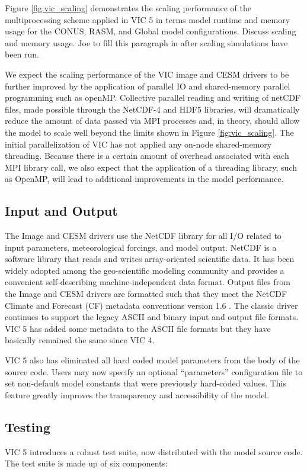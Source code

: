 \documentclass[gmd, manuscript]{copernicus}
\begin{document}
    Figure \ref{fig:vic_scaling} demonstrates the scaling performance of the multiprocessing scheme applied in VIC 5 in terms model runtime and memory usage for the CONUS, RASM, and Global model configurations.
    Discuss scaling and memory usage.
    Joe to fill this paragraph in after scaling simulations have been run.

    We expect the scaling performance of the VIC image and CESM drivers to be further improved by the application of parallel IO and shared-memory parallel programming such as openMP.
    Collective parallel reading and writing of netCDF files, made possible through the NetCDF-4 and HDF5 libraries, will dramatically reduce the amount of data passed via MPI processes and, in theory, should allow the model to scale well beyond the limits shown in Figure \ref{fig:vic_scaling}.
    The initial parallelization of VIC has not applied any on-node shared-memory threading.
    Because there is a certain amount of overhead associated with each MPI library call, we also expect that the application of a threading library, such as OpenMP, will lead to additional improvements in the model performance.

  \subsection{Input and Output}
    \label{sec:io}
    The Image and CESM drivers use the NetCDF library for all I/O related to input parameters, meteorological forcings, and model output.
    NetCDF is a software library that reads and writes array-oriented scientific data.
    It has been widely adopted among the geo-scientific modeling community and provides a convenient self-describing machine-independent data format.
    Output files from the Image and CESM drivers are formatted such that they meet the NetCDF Climate and Forecast (CF) metadata conventions version 1.6 \citep{Eaton_2003}.
    The classic driver continues to support the legacy ASCII and binary input and output file formats.
    VIC 5 has added some metadata to the ASCII file formats but they have basically remained the same since VIC 4.

    VIC 5 also has eliminated all hard coded model parameters from the body of the source code.
    Users may now specify an optional ``parameters'' configuration file to set non-default model constants that were previously hard-coded values.
    This feature greatly improves the transparency and accessibility of the model.

  \subsection{Testing}
    \label{sec:testing}
    VIC 5 introduces a robust test suite, now distributed with the model source code.
    The test suite is made up of six components:
\end{document}
